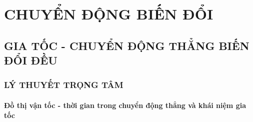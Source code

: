 \chapter{CHUYỂN ĐỘNG BIẾN ĐỔI}
\section{GIA TỐC - CHUYỂN ĐỘNG THẲNG BIẾN ĐỔI ĐỀU}
\subsection{LÝ THUYẾT TRỌNG TÂM}
\begin{tomtat}
	\subsubsection{Đồ thị vận tốc - thời gian trong chuyển động thẳng và khái niệm gia tốc}

\end{tomtat}
